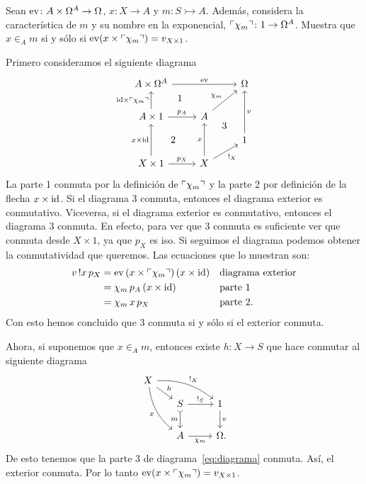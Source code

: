 \begin{exercise}[par=2,teca=2]
  Sean \(\mathrm{ev}\colon A\times\Omega^A\to\Omega\), \(x\colon X\to A\) y 
  \(m\colon S\rightarrowtail A\). Además, considera la característica de \(m\) y
  su nombre en la exponencial, \(\ulcorner\chi_m\urcorner\colon 1\to\Omega^A\). Muestra que 
  \(x\in_A m\) si y sólo si \(\mathrm{ev}(x\times\ulcorner\chi_m\urcorner) = v_{X\times 1}\).
\end{exercise}
\begin{solution}[print=true]
  Primero consideramos el siguiente diagrama
  \begin{equation}\label{eq:diagrama}
    \begin{tikzcd}[ampersand replacement=\&]
      A\times\Omega^A\ar{rr}{\ev} \&\& \Omega\\
      A\times 1\ar{u}{\id\times\name{\chi_m}}[name=a]{}\ar{r}{p_A}
      \& A\ar{ru}[name=b]{\chi_m} \\[-2ex]
      \&\& 1\ar{uu}[swap,name=y]{v} \\[-2ex]
      X\times 1\ar{uu}{x\times\id}[name=xid]{}\ar{r}{p_X}
      \& X\ar{uu}[name=x]{x}\ar{ur}[swap]{!_X}
      \ar[phantom, from=a, to=b, "1"]
      \ar[phantom, from=xid, to=x, "2"]
      \ar[phantom, from=x, to=y, "3"]
    \end{tikzcd}
  \end{equation}
  La parte 1 conmuta por la definición de \(\ulcorner\chi_m\urcorner\) y la parte 2 por
  definición de la flecha \(x\times\mathrm{id}\). Si el diagrama 3 conmuta, entonces el
  diagrama exterior es conmutativo. Viceversa, si el diagrama exterior es
  conmutativo, entonces el diagrama 3 conmuta. En efecto, para ver que 3 conmuta
  es suficiente ver que conmuta desde \(X\times 1\), ya que \(p_X\) es iso. Si
  seguimos el diagrama podemos obtener la conmutatividad que queremos. Las
  ecuaciones que lo muestran son:
  \begin{align*}
    v\,!x\,p_X &= \mathrm{ev}\,(x\times\ulcorner\chi_m\urcorner)\,(x\times\mathrm{id})
    && \text{diagrama exterior}\\
    & = \chi_m\,p_A\,(x\times\mathrm{id}) && \text{parte 1}\\
    &= \chi_m\,x\,p_X && \text{parte 2.}
  \end{align*} 
  Con esto hemos concluido que 3 conmuta si y sólo si el exterior conmuta.

  Ahora, si suponemos que \(x\in_A m\), entonces existe \(h\colon X\to S\) que
  hace conmutar al siguiente diagrama
  \begin{equation}\label{eq:defchi}
    \begin{tikzcd}[ampersand replacement=\&]
      X\ar[bend left=20]{rrd}{!_X}\ar[bend right=20]{ddr}[swap]{x}
        \ar{rd}{h}\\[-2ex]
      \&[-2ex] S\ar{r}{!_S}\ar[tail]{d}[swap]{m} \& 1\ar{d}{v}\\
      \& A\ar{r}[swap]{\chi_m} \& \Omega\mathrlap{.}
    \end{tikzcd}
  \end{equation}
  De esto tenemos que la parte 3 de diagrama~\ref{eq:diagrama} conmuta. Así, el
  exterior conmuta. Por lo tanto \(\mathrm{ev}(x\times\ulcorner\chi_m\urcorner)=v_{X\times 1}\).
  

\end{solution}
